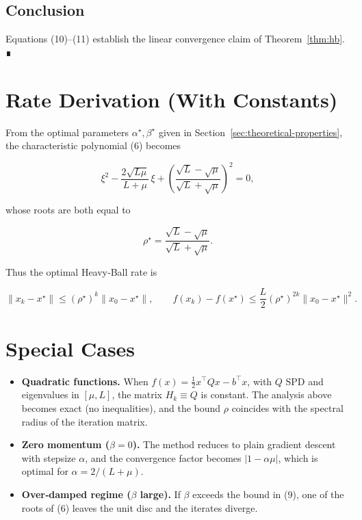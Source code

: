 \documentclass{article}
\begin{document}
\subsection*{Conclusion}
Equations (10)–(11) establish the linear convergence claim of
Theorem~\ref{thm:hb}.  ∎

\section*{Rate Derivation (With Constants)}
From the optimal parameters $\alpha^\star,\beta^\star$ given in
Section~\ref{sec:theoretical-properties}, the characteristic polynomial
(6) becomes  

\[
\xi^{2}-\frac{2\sqrt{L\mu}}{L+\mu}\,\xi+\left(\frac{\sqrt{L}-\sqrt{\mu}}
{\sqrt{L}+\sqrt{\mu}}\right)^{2}=0,
\]

whose roots are both equal to  

\[
\rho^\star=\frac{\sqrt{L}-\sqrt{\mu}}{\sqrt{L}+\sqrt{\mu}}.
\]

Thus the optimal Heavy‑Ball rate is  

\[
\|x_k-x^\star\|\le (\rho^\star)^k\|x_0-x^\star\|,
\qquad
f(x_k)-f(x^\star)\le \frac{L}{2}(\rho^\star)^{2k}\|x_0-x^\star\|^{2}.
\]

\section*{Special Cases}
\begin{itemize}
  \item \textbf{Quadratic functions.} When $f(x)=\frac12 x^\top Q x -b^\top x$,
        with $Q$ SPD and eigenvalues in $[\mu,L]$, the matrix $H_k\equiv Q$
        is constant.  The analysis above becomes exact (no inequalities),
        and the bound $\rho$ coincides with the spectral radius of the
        iteration matrix.
  \item \textbf{Zero momentum ($\beta=0$).} The method reduces to plain
        gradient descent with stepsize $\alpha$, and the convergence factor
        becomes $|1-\alpha\mu|$, which is optimal for $\alpha=2/(L+\mu)$.
  \item \textbf{Over‑damped regime ($\beta$ large).} If $\beta$ exceeds the
        bound in (9), one of the roots of (6) leaves the unit disc and the
        iterates diverge.
\end{itemize}
\end{document}
